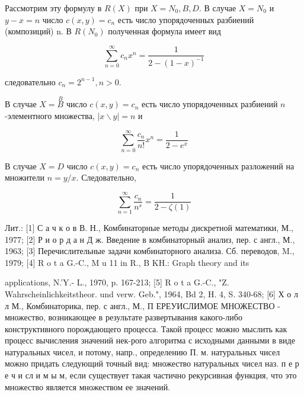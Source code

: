 \documentclass[10pt]{article}
\begin{document}
Рассмотрим эту формулу в $R(X)$ при $X=N_{0}, B, D$. В случае $X=N_{0}$ и $y-x=n$ число $c(x, y)=c_{n}$ есть число упорядоченных разбиений (композиций) n. В $R\left(N_{0}\right)$ полученная формула имеет вид



\[

\sum_{n=0}^{\infty} c_{n} x^{n}=\frac{1}{2-(1-x)^{-1}}

\]



следовательно $c_{n}=2^{n-1}, n>0$.



В случае $X=\stackrel{B}{B}$ число $c(x, y)=c_{n}$ есть число упорядоченных разбиений $n$-элементного множества, $|x \backslash y|=n$ и



\[

\sum_{n=0}^{\infty} \frac{c_{n}}{n !} x^{n}=\frac{1}{2-e^{x}}

\]



В случае $X=D$ число $c(x, y)=c_{n}$ есть число упорядоченных разложений на множители $n=y / x$. Следовательно,



\[

\sum_{n=1}^{\infty} \frac{c_{n}}{n^{s}}=\frac{1}{2-\zeta(1)}

\]



Лит.: [1] С а ч к о в В. Н., Комбинаторные методы дискретной математики, М., 1977; [2] Р и о р д а н Д ж. Введение в комбинаторный анализ, пер. с англ., М., 1963; [3] Перечислительные задачи комбинаторного анализа. Сб. переводов, M., 1979; [4] R o t a G.-C., M u 11 in R., B KH.: Graph theory and its

applications, N.'Y.- L., 1970, p. 167-213; [5] R o t a G.-C., "Z. Wahrscheinlichkeitstheor. und verw. Geb.", 1964, Bd 2, H. 4, S. 340-68; [6] Х о л л М., Комбинаторика, пер. с англ., М., П ЕРЕУИСЛИМОЕ МНОЖЕСТВО - множество, возникающее в результате развертывания какого-либо конструктивного порождающего процесса. Такой процесс можно мыслить как процесс вычисления значений нек-рого алгоритма с исходными данными в виде натуральных чисел, и потому, напр., определению П. м. натуральных чисел можно придать следующий точный вид: множество натуральных чисел наз. п е р е ч и сл и м ы м, если существует такая частично рекурсивная функция, что это множество является множеством ее значений.
\end{document}
